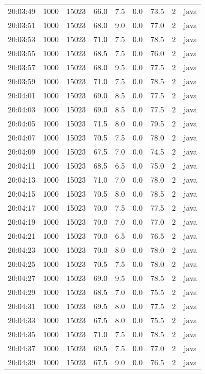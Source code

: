 \documentclass[11pt]{article}
\begin{document}
\begin{table}[htbp]
\begin{tabular}{rrrrrrrrl}
20:03:49 & 1000 & 15023 & 66.0 & 7.5 & 0.0 & 73.5 & 2 & java\\
20:03:51 & 1000 & 15023 & 68.0 & 9.0 & 0.0 & 77.0 & 2 & java\\
20:03:53 & 1000 & 15023 & 71.0 & 7.5 & 0.0 & 78.5 & 2 & java\\
20:03:55 & 1000 & 15023 & 68.5 & 7.5 & 0.0 & 76.0 & 2 & java\\
20:03:57 & 1000 & 15023 & 68.0 & 9.5 & 0.0 & 77.5 & 2 & java\\
20:03:59 & 1000 & 15023 & 71.0 & 7.5 & 0.0 & 78.5 & 2 & java\\
20:04:01 & 1000 & 15023 & 69.0 & 8.5 & 0.0 & 77.5 & 2 & java\\
20:04:03 & 1000 & 15023 & 69.0 & 8.5 & 0.0 & 77.5 & 2 & java\\
20:04:05 & 1000 & 15023 & 71.5 & 8.0 & 0.0 & 79.5 & 2 & java\\
20:04:07 & 1000 & 15023 & 70.5 & 7.5 & 0.0 & 78.0 & 2 & java\\
20:04:09 & 1000 & 15023 & 67.5 & 7.0 & 0.0 & 74.5 & 2 & java\\
20:04:11 & 1000 & 15023 & 68.5 & 6.5 & 0.0 & 75.0 & 2 & java\\
20:04:13 & 1000 & 15023 & 71.0 & 7.0 & 0.0 & 78.0 & 2 & java\\
20:04:15 & 1000 & 15023 & 70.5 & 8.0 & 0.0 & 78.5 & 2 & java\\
20:04:17 & 1000 & 15023 & 70.0 & 7.5 & 0.0 & 77.5 & 2 & java\\
20:04:19 & 1000 & 15023 & 70.0 & 7.0 & 0.0 & 77.0 & 2 & java\\
20:04:21 & 1000 & 15023 & 70.0 & 6.5 & 0.0 & 76.5 & 2 & java\\
20:04:23 & 1000 & 15023 & 70.0 & 8.0 & 0.0 & 78.0 & 2 & java\\
20:04:25 & 1000 & 15023 & 70.5 & 7.5 & 0.0 & 78.0 & 2 & java\\
20:04:27 & 1000 & 15023 & 69.0 & 9.5 & 0.0 & 78.5 & 2 & java\\
20:04:29 & 1000 & 15023 & 68.5 & 7.0 & 0.0 & 75.5 & 2 & java\\
20:04:31 & 1000 & 15023 & 69.5 & 8.0 & 0.0 & 77.5 & 2 & java\\
20:04:33 & 1000 & 15023 & 67.5 & 8.0 & 0.0 & 75.5 & 2 & java\\
20:04:35 & 1000 & 15023 & 71.0 & 7.5 & 0.0 & 78.5 & 2 & java\\
20:04:37 & 1000 & 15023 & 69.5 & 7.5 & 0.0 & 77.0 & 2 & java\\
20:04:39 & 1000 & 15023 & 67.5 & 9.0 & 0.0 & 76.5 & 2 & java\\

\end{tabular}
\end{table}
\end{document}

